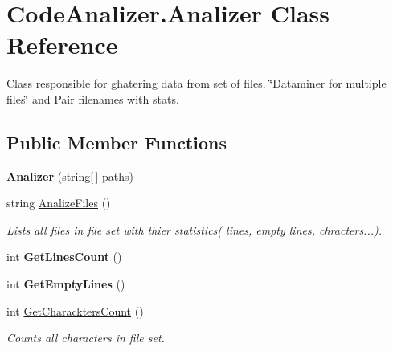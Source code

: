 \hypertarget{class_code_analizer_1_1_analizer}{}\section{Code\+Analizer.\+Analizer Class Reference}
\label{class_code_analizer_1_1_analizer}


Class responsible for ghatering data from set of files. \char`\"{}\+Dataminer for multiple files\char`\"{} and Pair filenames with stats.  


\subsection*{Public Member Functions}
\begin{DoxyCompactItemize}
\item 
\mbox{\label{class_code_analizer_1_1_analizer_ae88a3c45078872c308e2c5604248cf50}} 
{\bfseries Analizer} (string\mbox{[}$\,$\mbox{]} paths)
\item 
string \mbox{\hyperlink{class_code_analizer_1_1_analizer_a9a16d095345306736f2e7adc3d95a1c8}{Analize\+Files}} ()
\begin{DoxyCompactList}\small\item\em Lists all files in file set with thier statistics( lines, empty lines, chracters...). \end{DoxyCompactList}\item 
\mbox{\label{class_code_analizer_1_1_analizer_a5b7a9f2c835e8f9b43f3d9810e8dd91e}} 
int {\bfseries Get\+Lines\+Count} ()
\item 
\mbox{\label{class_code_analizer_1_1_analizer_a0a03f7f53bd6e7283a4f91ad0714a922}} 
int {\bfseries Get\+Empty\+Lines} ()
\item 
int \mbox{\hyperlink{class_code_analizer_1_1_analizer_a97730ca4bd3b1dbe6257779279f0f7f4}{Get\+Charackters\+Count}} ()
\begin{DoxyCompactList}\small\item\em Counts all characters in file set. \end{DoxyCompactList}\item 
\mbox{\label{class_code_analizer_1_1_analizer_a24b3b64b468e6e78c6050d4873e21125}} 

\end{DoxyCompactItemize}
